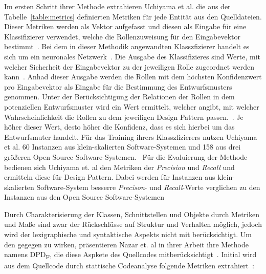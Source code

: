 Im ersten Schritt ihrer Methode extrahieren Uchiyama et al. die aus der Tabelle~\ref{table:metrics} definierten Metriken für jede Entität aus den Quelldateien. 
Dieser Metriken werden als Vektor aufgefasst und diesen als Eingabe für eine Klassifizierer verwendet, welche die Rollenzuweisung für den Eingabevektor bestimmt~\cite[S. 5]{Uchiyama2014}.
Bei dem in dieser Methodik angewandten Klasszfizierer handelt es sich um ein neuronales Netzwerk~\cite[S. 4]{Uchiyama2014}.
Die Ausgabe des Klassifizieres sind Werte, mit welcher Sicherheit der Eingabevektor zu der jeweiligen Rolle zugeordnet werden kann~\cite[S. 5]{Uchiyama2014}.
Anhad dieser Ausgabe werden die Rollen mit dem höchsten Konfidenzwert pro Eingabevektor als Eingabe für die Bestimmung des Entwurfsmusters genommen. Unter der Berücksichtigung der Relationen der Rollen in dem potenziellen Entwurfsmuster wird ein Wert ermittelt,
welcher angibt, mit welcher Wahrscheinlichkeit die Rollen zu dem jeweiligen Design Pattern passen.~\cite[S. 6]{Uchiyama2014}. Je höher dieser Wert, desto höher die Konfidenz, dass es sich hierbei um das Entwurfsmuter handelt.
Für das Training ihrers Klasszfizierers nutzen Uchiyama et al. 60 Instanzen aus klein-skalierten Software-Systemen und 158 aus drei größeren Open Source Software-Systemen.~\cite[S. 7]{Uchiyama2014}
Für die Evaluierung der Methode bedienen sich Uchiyama et. al den Metriken der \textit{Precision} und \textit{Recall} und ermitteln diese für Design Pattern.
Dabei werden für Instanzen aus klein-skalierten Software-System besserre \textit{Precison}- und \textit{Recall}-Werte verglichen zu den Instanzen aus den Open Source Software-Systemen~\cite[S. 8]{Uchiyama2014}

\smallbreak

Durch Charakterisierung der Klassen, Schnittstellen und Objekte durch Metriken und Maße sind zwar der Rückschlüsse auf Struktur und Verhalten möglich, jedoch wird der lexigraphische und syntaktische Aspekts nicht mit berücksichtigt.
Um den gegegen zu wirken, präsentieren Nazar et. al in ihrer Arbeit ihre Methode namens DPD\textsubscript{F}, die diese Aspkete des Quellcodes mitberücksichtigt~\cite[S. 1]{Nazar2020}.
Initial wird aus dem Quellcode durch stattische Codeanalyse folgende Metriken extrahiert~\cite[S. 5]{Nazar2020}:


